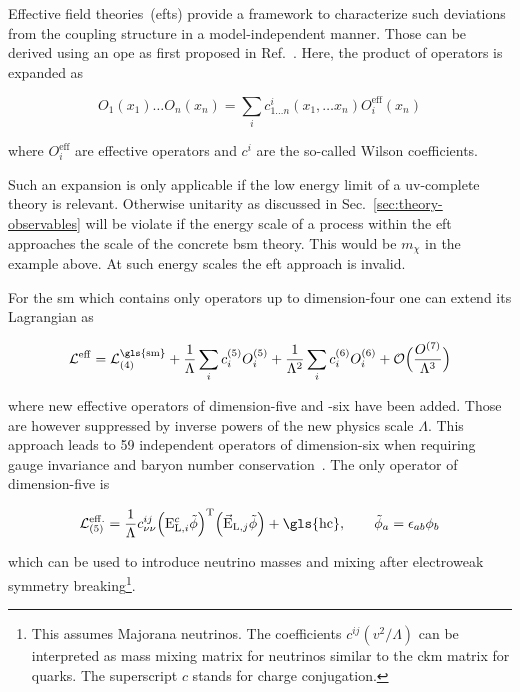 Effective field theories~(\glspl{eft}) provide a framework to characterize such deviations from the coupling structure in a model-independent manner. Those can be derived using an \gls{ope} as first proposed in Ref.~\cite{Wilson:1972ee}. Here, the product of operators is expanded as

\begin{equation}
{O}_{1}(x_{1})\ldots {O}_{n}(x_{n})=\sum_{i}c_{1\ldots n}^{i}(x_{1},\ldots x_{n}){O}_{i}^\mathrm{eff}(x_{n})
\end{equation}

where $O_{i}^\mathrm{eff}$ are effective operators and $c^{i}$ are the so-called Wilson coefficients.

Such an expansion is only applicable if the low energy limit of a \gls{uv}-complete theory is relevant. Otherwise unitarity as discussed in Sec.~\ref{sec:theory-observables} will be violate if the energy scale of a process within the \gls{eft} approaches the scale of the concrete \gls{bsm} theory. This would be $m_\chi$ in the example above. At such energy scales the \gls{eft} approach is invalid.

For the \gls{sm} which contains only operators up to dimension-four one can extend its Lagrangian as

\begin{equation}
\mathcal{L}^\mathrm{eff}=\mathcal{L}^\mathrm{\gls{sm}}_\mathrm{(4)}+\frac{1}{\Lambda}\sum_{i}c_{i}^\mathrm{(5)}{O}_{i}^\mathrm{(5)}+\frac{1}{\Lambda^{2}}\sum_{i}c_{i}^\mathrm{(6)}{O}_{i}^\mathrm{(6)}+\mathcal{O}\Big(\frac{O^\mathrm{(7)}}{\Lambda^3}\Big)
\end{equation}

where new effective operators of dimension-five and -six have been added. Those are however suppressed by inverse powers of the new physics scale $\Lambda$. This approach leads to 59 independent operators of dimension-six when requiring gauge invariance and baryon number conservation~\cite{Grzadkowski:2010es}. The only operator of dimension-five is

\begin{equation}
\mathcal{L}^\mathrm{eff.}_\mathrm{(5)}=\frac{1}{\Lambda}c^{ij}_{\nu\nu}\Big({\mathrm{E}}^{c}_{\mathrm{L},i}\tilde{\phi}\Big)^\mathrm{T}\Big(\vec{\mathrm{E}}_{\mathrm{L},j}\tilde{\phi}\Big)+\mathrm{\gls{hc}},\qquad \tilde{\phi}_{a}=\epsilon_{ab}\phi_{b}
\end{equation}

which can be used to introduce neutrino masses and mixing after electroweak symmetry breaking\footnote{This assumes Majorana neutrinos. The coefficients $c^{ij}(v^2/\Lambda)$ can be interpreted as mass mixing matrix for neutrinos similar to the \gls{ckm} matrix for quarks. The superscript $c$ stands for charge conjugation.}.

